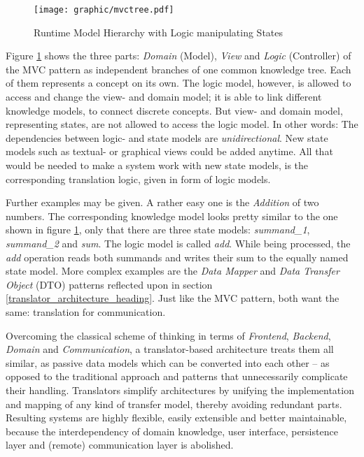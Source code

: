 \begin{figure}[ht]
    \begin{center}
        \texttt{[image: graphic/mvctree.pdf]}
        \caption{Runtime Model Hierarchy with Logic manipulating States}
        \label{mvctree_figure}
    \end{center}
\end{figure}

Figure \ref{mvctree_figure} shows the three parts: \emph{Domain} (Model),
\emph{View} and \emph{Logic} (Controller) of the MVC pattern as independent
branches of one common knowledge tree. Each of them represents a concept on its
own. The logic model, however, is allowed to access and change the view- and
domain model; it is able to link different knowledge models, to connect
discrete concepts. But view- and domain model, representing states, are not
allowed to access the logic model. In other words: The dependencies between
logic- and state models are \emph{unidirectional}. New state models such as
textual- or graphical views could be added anytime. All that would be needed to
make a system work with new state models, is the corresponding translation
logic, given in form of logic models.

Further examples may be given. A rather easy one is the \emph{Addition} of two
numbers. The corresponding knowledge model looks pretty similar to the one
shown in figure \ref{mvctree_figure}, only that there are three state models:
\emph{summand\_1}, \emph{summand\_2} and \emph{sum}. The logic model is called
\emph{add}. While being processed, the \emph{add} operation reads both summands
and writes their sum to the equally named state model. More complex examples
are the \emph{Data Mapper} and \emph{Data Transfer Object} (DTO) patterns
reflected upon in section \ref{translator_architecture_heading}. Just like the
MVC pattern, both want the same: translation for communication.

Overcoming the classical scheme of thinking in terms of \emph{Frontend},
\emph{Backend}, \emph{Domain} and \emph{Communication}, a translator-based
architecture treats them all similar, as passive data models which can be
converted into each other -- as opposed to the traditional approach and patterns
that unnecessarily complicate their handling. Translators simplify architectures
by unifying the implementation and mapping of any kind of transfer model,
thereby avoiding redundant parts. Resulting systems are highly flexible, easily
extensible and better maintainable, because the interdependency of domain
knowledge, user interface, persistence layer and (remote) communication layer
is abolished.

